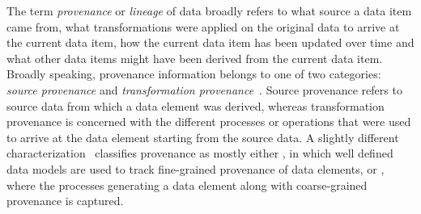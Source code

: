 
% 
% 
% 
% 
% 
% 

The term \textit{provenance} or \textit{lineage} of data broadly refers to what source a data item came from, what transformations were applied on the original data to arrive at the current data item, how the current data item has been updated over time and what other data items might have been derived from the current data item. Broadly speaking, provenance information belongs to one of two categories: \textit{source provenance} and \textit{transformation provenance}~\cite{tan_ieee04}. Source provenance refers to source data from which a data element was derived, whereas transformation provenance is concerned with the different processes or operations that were used to arrive at the data element starting from the source data. A slightly different characterization~\cite{ikeda2010panda} classifies provenance as mostly either , in which well defined data models are used to track fine-grained provenance of data elements, or , where the processes generating a data element along with coarse-grained provenance is captured. 

